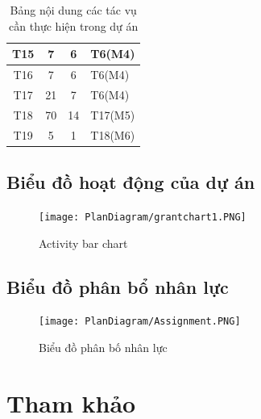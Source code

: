 \documentclass[a4paper, 12pt]{article}
\begin{document}
\begin{table}[H]
\begin{center}
\begin{tabular}{|c|c|c|l|}
            T15     & 7                    & 6               &T6(M4) \\ \hline \rowcolor[HTML]{C9DAF8} 
            T16     & 7                    & 6               &T6(M4) \\ \hline \rowcolor[HTML]{C9DAF8} 
            T17     & 21                   & 7               &T6(M4) \\ \hline \rowcolor[HTML]{FCE5CD} 
            T18     & 70                   & 14              &T17(M5) \\ \hline \rowcolor[HTML]{D0E0E3} 
            T19     & 5                    & 1               &T18(M6) \\ \hline
            \end{tabular}
            \caption{Bảng nội dung các tác vụ cần thực hiện trong dự án}
        \end{center}
    \end{table}

    \subsection{Biểu đồ hoạt động của dự án}
    \begin{figure}[H]
        \begin{center}
            \texttt{[image: PlanDiagram/grantchart1.PNG]}
            \caption{Activity bar chart}
        \end{center}
    \end{figure}

    \subsection{Biểu đồ phân bổ nhân lực}
    \begin{figure}[H]
        \begin{center}
            \texttt{[image: PlanDiagram/Assignment.PNG]}
            \caption{Biểu đồ phân bố nhân lực}
        \end{center}
    \end{figure}
    \clearpage

    \section{Tham khảo}
    \label{sec:reference}
    \clearpage
\end{document}
